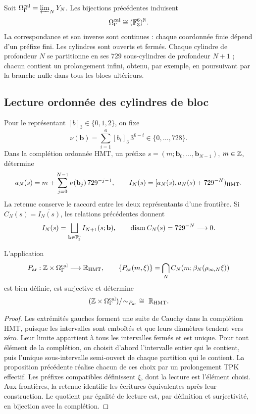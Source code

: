 Soit \(\Omega_{\Gamma}^{\rm cal}=\varprojlim_NY_N\). Les bijections précédentes induisent
\[
 \Omega_{\Gamma}^{\rm cal}\cong(\mathbb F_3^6)^{\mathbb N}.
\]
La correspondance et son inverse sont continues : chaque coordonnée finie dépend d’un préfixe fini. Les cylindres sont ouverts et fermés. Chaque cylindre de profondeur \(N\) se partitionne en ses \(729\) sous-cylindres de profondeur \(N+1\) ; chacun contient un prolongement infini, obtenu, par exemple, en poursuivant par la branche nulle dans tous les blocs ultérieurs.



\subsection{Lecture ordonnée des cylindres de bloc}
\label{hmtfg:publicacion-cilindros-bloque}

Pour le représentant \([b]_3\in\{0,1,2\}\), on fixe
\[
 \nu(\mathbf b)=\sum_{i=1}^6[b_i]_3\,3^{6-i}\in\{0,\ldots,728\}.
\]
Dans la complétion ordonnée HMT, un préfixe
\(s=(m;\mathbf b_0,\ldots,\mathbf b_{N-1})\), \(m\in\mathbb Z\), détermine
\[
 a_N(s)=m+\sum_{j=0}^{N-1}\nu(\mathbf b_j)\,729^{-j-1},\qquad
 I_N(s)=[a_N(s),a_N(s)+729^{-N})_{\rm HMT}.
\]
La retenue conserve le raccord entre les deux représentants d’une frontière. Si \(C_N(s)=\overline{I_N(s)}\), les relations précédentes donnent
\[
 I_N(s)=\bigsqcup_{\mathbf b\in\mathbb F_3^6}I_{N+1}(s;\mathbf b),
 \qquad \operatorname{diam}C_N(s)=729^{-N}\longrightarrow0.
\]

\begin{proposition}
\label{hmtfg:cobertura-arquimediana}
L'application
\[
 P_{\rm ar}:\mathbb Z\times\Omega_\Gamma^{\rm cal}
       \longrightarrow\mathbb R_{\rm HMT},\qquad
 \{P_{\rm ar}(m,\xi)\}
    =\bigcap_N C_N(m;\beta_N(\rho_{\infty,N}\xi))
\]
est bien définie, est surjective et détermine
\[
 (\mathbb Z\times\Omega_\Gamma^{\rm cal})/\!\sim_{P_{\rm ar}}
       \ \cong\ \mathbb R_{\rm HMT}.
\]
\end{proposition}
\begin{proof}
Les extrémités gauches forment une suite de Cauchy dans la complétion HMT, puisque les intervalles sont emboîtés et que leurs diamètres tendent vers zéro. Leur limite appartient à tous les intervalles fermés et est unique. Pour tout élément de la complétion, on choisit d’abord l’intervalle entier qui le contient, puis l’unique sous-intervalle semi-ouvert de chaque partition qui le contient. La proposition précédente réalise chacun de ces choix par un prolongement TPK effectif. Les préfixes compatibles définissent \(\xi\), dont la lecture est l’élément choisi. Aux frontières, la retenue identifie les écritures équivalentes après leur construction. Le quotient par égalité de lecture est, par définition et surjectivité, en bijection avec la complétion.
\end{proof}

